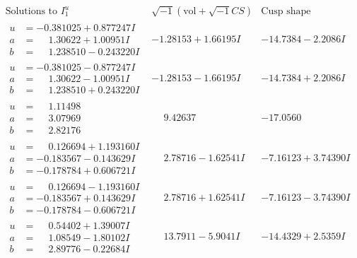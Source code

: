 \documentclass[1p]{elsarticle_modified}
\theoremstyle{definition}
\newcommand{\I}{\sqrt{-1}}
\begin{document}
$$\begin{array}{c|c|c}  
\text{Solutions to }I^u_{1}& \I (\text{vol} + \sqrt{-1}CS) & \text{Cusp shape}\\
 \hline 
\begin{aligned}
u &= -0.381025 + 0.877247 I \\
a &= \phantom{-}1.30622 + 1.00951 I \\
b &= \phantom{-}1.238510 - 0.243220 I\end{aligned}
 & -1.28153 + 1.66195 I & -14.7384 - 2.2086 I \\ \hline\begin{aligned}
u &= -0.381025 - 0.877247 I \\
a &= \phantom{-}1.30622 - 1.00951 I \\
b &= \phantom{-}1.238510 + 0.243220 I\end{aligned}
 & -1.28153 - 1.66195 I & -14.7384 + 2.2086 I \\ \hline\begin{aligned}
u &= \phantom{-}1.11498\phantom{ +0.000000I} \\
a &= \phantom{-}3.07969\phantom{ +0.000000I} \\
b &= \phantom{-}2.82176\phantom{ +0.000000I}\end{aligned}
 & \phantom{-}9.42637\phantom{ +0.000000I} & -17.0560\phantom{ +0.000000I} \\ \hline\begin{aligned}
u &= \phantom{-}0.126694 + 1.193160 I \\
a &= -0.183567 - 0.143629 I \\
b &= -0.178784 + 0.606721 I\end{aligned}
 & \phantom{-}2.78716 - 1.62541 I & -7.16123 + 3.74390 I \\ \hline\begin{aligned}
u &= \phantom{-}0.126694 - 1.193160 I \\
a &= -0.183567 + 0.143629 I \\
b &= -0.178784 - 0.606721 I\end{aligned}
 & \phantom{-}2.78716 + 1.62541 I & -7.16123 - 3.74390 I \\ \hline\begin{aligned}
u &= \phantom{-}0.54402 + 1.39007 I \\
a &= \phantom{-}1.08549 - 1.80102 I \\
b &= \phantom{-}2.89776 - 0.22684 I\end{aligned}
 & \phantom{-}13.7911 - 5.9041 I & -14.4329 + 2.5359 I \\ \hline\begin{aligned}

\end{aligned}
\end{array}$$
\end{document}
